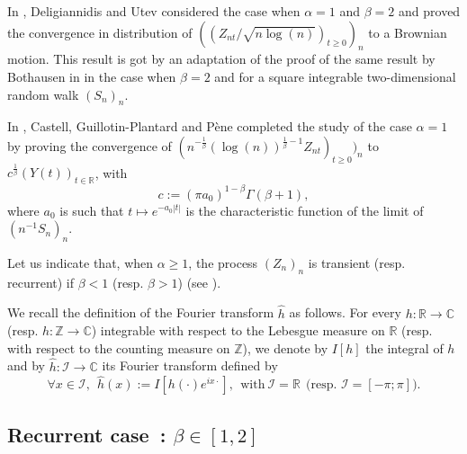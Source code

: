 \documentclass[oneside, a4paper,11pt,reqno]{amsart}
\begin{document}
\noindent In \cite{DU}, Deligiannidis and Utev considered the case when $\alpha=1$ and $\beta=2$
and proved the convergence in distribution of $( (Z_{nt} /\sqrt{n\log(n)})_{t\ge 0})_n$ to
a Brownian motion. This result is got by an adaptation of the proof of the same result 
by Bothausen in \cite{bolthausen} in the case 
when $\beta=2$ and for a square integrable two-dimensional random walk $(S_n)_n$.

\noindent In \cite{FFN}, Castell, Guillotin-Plantard and P\`ene completed the study of the case
$\alpha=1$ by proving the convergence of $( n^{-\frac 1\beta}(\log(n))^{\frac 1\beta-1}
Z_{nt})_{t\ge 0} )_n$ to $c^{\frac 1\beta}(Y(t))_{t\in\mathbb R}$, with 
\begin{equation}\label{cc}
c:=(\pi a_0)^{1-\beta}\Gamma(\beta+1),
\end{equation}
 where $a_0$ is such that
$t\mapsto e^{-a_0|t|}$ is the characteristic function of the limit of
$(n^{-1}S_n)_n$.

\noindent Let us indicate that, when $\alpha\ge 1$, the process
$(Z_n)_n$ is transient (resp. recurrent) if $\beta<1$
(resp. $\beta> 1$) (see \cite{BFFN,KS}).

\noindent We recall the definition of the Fourier transform $\hat h$ as follows.
For every $h:\mathbb R\rightarrow \mathbb C$ (resp. $h:\mathbb Z\rightarrow \mathbb C$)
integrable with respect to the Lebesgue measure on $\mathbb R$ (resp. with
respect to the counting measure on $\mathbb Z$), we denote by $I[h]$
the integral of $h$ and by $\hat h:\mathcal I\rightarrow\mathbb C$ its Fourier transform
defined by
$$\forall x\in{\mathcal I},\ \ \hat h(x):=I[h(\cdot)e^{ix\cdot}],\ \ \mbox{with}\
   {\mathcal I}={\mathbb R}\ \ \mbox{(resp. } {\mathcal I}=[-\pi;\pi]\mbox{)}.$$ 
\subsection{Recurrent case~: $\beta\in [1,2]$} 
\end{document}
